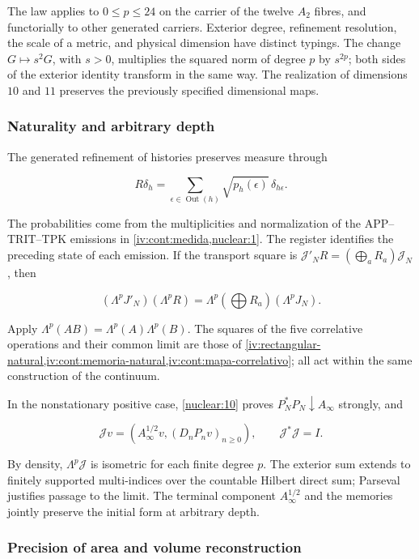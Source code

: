 The law applies to \(0\le p\le24\) on the carrier of the twelve \(A_2\) fibres, and functorially to other generated carriers. Exterior degree, refinement resolution, the scale of a metric, and physical dimension have distinct typings. The change \(G\mapsto s^2G\), with \(s>0\), multiplies the squared norm of degree \(p\) by \(s^{2p}\); both sides of the exterior identity transform in the same way. The realization of dimensions \(10\) and \(11\) preserves the previously specified dimensional maps.

\subsubsection{Naturality and arbitrary depth}

The generated refinement of histories preserves measure through

\[
R\delta_h=\sum_{\epsilon\in\operatorname{Out}(h)}
\sqrt{p_h(\epsilon)}\,\delta_{h\epsilon}.
\]

The probabilities come from the multiplicities and normalization of the APP--TRIT--TPK emissions in \cref{iv:cont:medida,nuclear:1}. The register identifies the preceding state of each emission. If the transport square is \(\mathcal J'_NR=(\bigoplus_aR_a)\mathcal J_N\), then

\begin{equation}
(\Lambda^pJ'_N)(\Lambda^pR)
=\Lambda^p(\bigoplus R_a)(\Lambda^pJ_N).
\label{nuc11:eq:23}
\end{equation}

Apply \(\Lambda^p(AB)=\Lambda^p(A)\Lambda^p(B)\). The squares of the five correlative operations and their common limit are those of \cref{iv:rectangular-natural,iv:cont:memoria-natural,iv:cont:mapa-correlativo}; all act within the same construction of the continuum.

In the nonstationary positive case, \cref{nuclear:10} proves \(P_N^*P_N\downarrow A_\infty\) strongly, and

\[
\mathcal Jv=(A_\infty^{1/2}v,(D_nP_nv)_{n\ge0}),
\qquad \mathcal J^*\mathcal J=I.
\]

By density, \(\Lambda^p\mathcal J\) is isometric for each finite degree \(p\). The exterior sum extends to finitely supported multi-indices over the countable Hilbert direct sum; Parseval justifies passage to the limit. The terminal component \(A_\infty^{1/2}\) and the memories jointly preserve the initial form at arbitrary depth.

\subsubsection{Precision of area and volume reconstruction}

